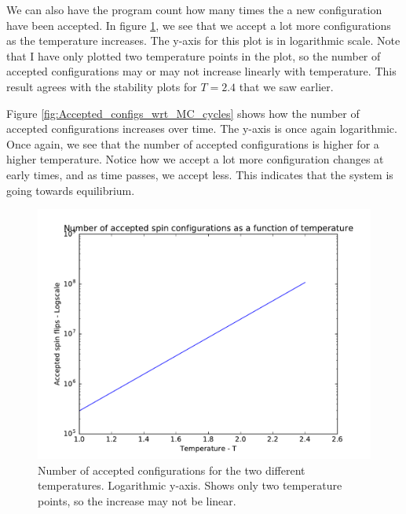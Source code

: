 \documentclass[12pt]{article}
\begin{document}
We can also have the program count how many times the a new configuration have been accepted. In figure \ref{fig:Accepted_configs_wrt_temp}, we see that we accept a lot more configurations as the temperature increases. The y-axis for this plot is in logarithmic scale. Note that I have only plotted two temperature points in the plot, so the number of accepted configurations may or may not increase linearly with temperature. This result agrees with the stability plots for $T=2.4$ that we saw earlier. 

Figure \ref{fig:Accepted_configs_wrt_MC_cycles} shows how the number of accepted configurations increases over time. The y-axis is once again logarithmic. Once again, we see that the number of accepted configurations is higher for a higher temperature. Notice how we accept a lot more configuration changes at early times, and as time passes, we accept less. This indicates that the system is going towards equilibrium. 

\begin{figure}[H]
\centering
\includegraphics[width=\linewidth]{Plots/Accepted_configs_wrt_temp.pdf}
\caption{Number of accepted configurations for the two different temperatures. Logarithmic y-axis. Shows only two temperature points, so the increase may not be linear.}
\label{fig:Accepted_configs_wrt_temp}
\end{figure}
\end{document}
